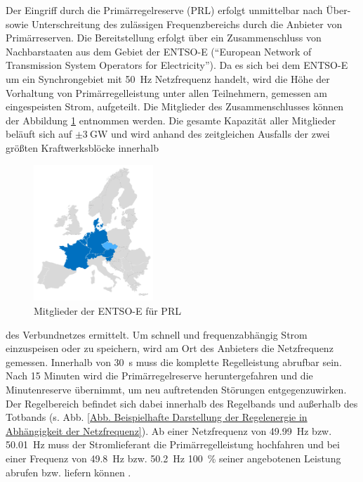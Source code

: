 			Der Eingriff durch die Primärregelreserve (PRL) erfolgt unmittelbar nach Über- sowie Unterschreitung des zulässigen Frequenzbereichs durch die Anbieter von Primärreserven.
			Die Bereitstellung erfolgt über ein Zusammenschluss von Nachbarstaaten aus dem Gebiet der ENTSO-E ("`European Network of Transmission System Operators for Electricity"').
			Da es sich bei dem ENTSO-E um ein Synchrongebiet mit \SI{50}{\hertz} Netzfrequenz handelt, wird die Höhe der Vorhaltung von Primärregelleistung unter allen Teilnehmern, gemessen am eingespeisten Strom, aufgeteilt.
			Die Mitglieder des Zusammenschlusses können der Abbildung \ref{Abb. Mitglieder ENTSO-E} entnommen werden. 
			Die gesamte Kapazität aller Mitglieder beläuft sich auf $\pm\SI{3}{\giga\watt}$ und wird anhand des zeitgleichen Ausfalls der zwei größten Kraftwerksblöcke innerhalb\begin{figure}
				\centering
				\includegraphics[page=1,trim=70 70 70 120, clip, width=0.4\textwidth]{./anhang/frc-map.png}
				\caption{Mitglieder der ENTSO-E für PRL\parencite{ENTSO-E_PRL}}
				\label{Abb. Mitglieder ENTSO-E}
			\end{figure} des Verbundnetzes ermittelt.
			Um schnell und frequenzabhängig Strom einzuspeisen oder zu speichern, wird am Ort des Anbieters die Netzfrequenz gemessen. 
			Innerhalb von \SI{30}{\second} muss die komplette Regelleistung abrufbar sein.
			Nach \num{15} Minuten wird die Primärregelreserve heruntergefahren und die Minutenreserve übernimmt, um neu auftretenden Störungen entgegenzuwirken.
			Der Regelbereich befindet sich dabei innerhalb des Regelbands und außerhalb des Totbands (s. Abb. \ref{Abb. Beispielhafte Darstellung der Regelenergie in Abhängigkeit der Netzfrequenz}).
			Ab einer Netzfrequenz von \SI{49,99}{\hertz} bzw. \SI{50,01}{\hertz} muss der Stromlieferant die Primärregelleistung hochfahren und bei einer Frequenz von \SI{49,8}{\hertz} bzw. \SI{50,2}{\hertz} \SI{100}{\percent} seiner angebotenen Leistung abrufen bzw. liefern können \cite{Primäreserve_NextKraftwerke}. 
			

